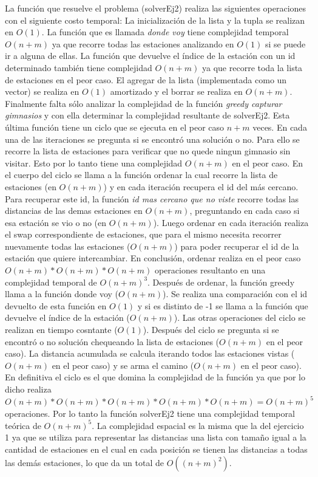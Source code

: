       La función que resuelve el problema (solverEj2) realiza las siguientes operaciones con el siguiente costo temporal: La inicialización de la lista y la tupla se realizan en $O(1)$. La función que es llamada \textit{donde voy} tiene complejidad temporal $O(n+m)$ ya que recorre todas las estaciones analizando en $O(1)$ si se puede ir a alguna de ellas. La función que devuelve el índice de la estación con un id determinado también tiene complejidad $O(n+m)$ ya que recorre toda la lista de estaciones en el peor caso. El agregar de la lista (implementada como un vector) se realiza en $O(1)$ amortizado y el borrar se realiza en $O(n+m)$. Finalmente falta sólo analizar la complejidad de la función \textit{greedy capturar gimnasios} y con ella determinar la complejidad resultante de solverEj2. 
      Esta última función tiene un ciclo que se ejecuta en el peor caso $n+m$ veces. En cada una de las iteraciones se pregunta si se encontró una solución o no. Para ello se recorre la lista de estaciones para verificar que no quede ningun gimnasio sin visitar. Esto por lo tanto tiene una complejidad $O(n+m)$ en el peor caso. En el cuerpo del ciclo se llama a la función ordenar la cual recorre la lista de estaciones (en $O(n+m)$) y en cada iteración recupera el id del más cercano. Para recuperar este id, la función \textit{id mas cercano que no viste} recorre todas las distancias de las demas estaciones en $O(n+m)$, preguntando en cada caso si esa estación se vio o no (en $O(n+m)$). Luego ordenar en cada iteración realiza el swap correspondiente de estaciones, que para el mismo necesita recorrer nuevamente todas las estaciones ($O(n+m)$) para poder recuperar el id de la estación que quiere intercambiar. En conclusión, ordenar realiza en el peor caso $O(n+m)*O(n+m)*O(n+m)$ operaciones resultanto en una complejidad temporal de $O(n+m)^3$. 
      Después de ordenar, la función greedy llama a la función donde voy ($O(n+m)$). Se realiza una comparación con el id devuelto de esta función en $O(1)$ y si es distinto de -1 se llama a la función que devuelve el índice de la estación ($O(n+m)$). Las otras operaciones del ciclo se realizan en tiempo cosntante ($O(1)$). 
      Después del ciclo se pregunta si se encontró o no solución chequeando la lista de estaciones ($O(n+m)$ en el peor caso). La distancia acumulada se calcula iterando todos las estaciones vistas ($O(n+m)$ en el peor caso) y se arma el camino ($O(n+m)$ en el peor caso). En definitiva el ciclo es el que domina la complejidad de la función ya que por lo dicho realiza $O(n+m)*O(n+m)*O(n+m)*O(n+m)*O(n+m) = O(n+m)^5$ operaciones.
      Por lo tanto la función solverEj2 tiene una complejidad temporal teórica de $O(n+m)^5$. La complejidad espacial es la misma que la del ejercicio 1 ya que se utiliza para representar las distancias una lista con tamaño igual a la cantidad de estaciones en el cual en cada posición se tienen las distancias a todas las demás estaciones, lo que da un total de $O((n+m)^2)$. 

